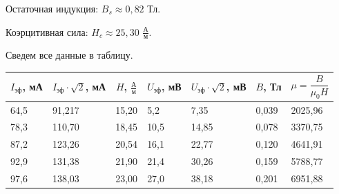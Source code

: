 \documentclass[a4paper,12pt]{article} %
\begin{document}
\vspace{5mm}
Остаточная индукция: $B_s \approx 0,82$ Тл.

\vspace{5mm}
Коэрцитивная сила: $H_c \approx 25,30$ $\frac{\text{А}}{\text{м}}$. 


\newpage
Сведем все данные в таблицу.
\begin{table}[h!]
	\centering
	\begin{tabular}{|l|l|l|l|l|l|l|}
		\hline
		\multicolumn{1}{|c|}{$I_{\text{эф}}$, мА} & \multicolumn{1}{c|}{$I_{\text{эф}} \cdot \sqrt{2}$, мА} & \multicolumn{1}{c|}{$H$, $\frac{\text{А}}{\text{м}}$} & \multicolumn{1}{c|}{$U_{\text{эф}}$, мВ} & \multicolumn{1}{c|}{$U_{\text{эф}} \cdot \sqrt{2}$, мВ} & \multicolumn{1}{c|}{$B$, Тл} & \multicolumn{1}{c|}{$\mu = \dfrac{B}{\mu_0 H}$} \\ \hline
		64,5                                      & 91,217                                                  & 15,20                                                 & 5,2                                      & 7,35                                                    & 0,039                        & 2025,96                                         \\ \hline
		78,3                                      & 110,70                                                  & 18,45                                                 & 10,5                                     & 14,85                                                   & 0,078                        & 3370,75                                         \\ \hline
		87,2                                      & 123,26                                                  & 20,54                                                 & 16,1                                     & 22,77                                                   & 0,120                        & 4641,91                                         \\ \hline
		92,9                                      & 131,38                                                  & 21,90                                                 & 21,4                                     & 30,26                                                   & 0,159                        & 5788,77                                         \\ \hline
		97,6                                      & 138,03                                                  & 23,00                                                 & 27,0                                     & 38,18                                                   & 0,201                        & 6951,88                                         \\ \hline

\end{tabular}
\end{table}
\end{document}
